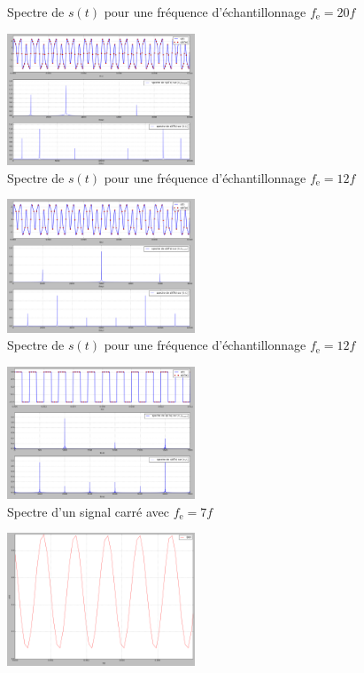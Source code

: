 \documentclass[a4paper]{article}
\begin{document}
\begin{multicols}{2}
\begin{figure}[H]
			\caption{Spectre de $s(t)$\/ pour une fréquence d'échantillonnage $f_\text{e} = 20f$}
		\end{figure}
		\begin{figure}[H]
			\centering
			\includegraphics[width=0.5\textwidth]{figures/Capture7.png}
			\caption{Spectre de $s(t)$\/ pour une fréquence d'échantillonnage $f_\text{e} = 12f$}
		\end{figure}
		\begin{figure}[H]
			\centering
			\includegraphics[width=0.5\textwidth]{figures/Capture8.png}
			\caption{Spectre de $s(t)$\/ pour une fréquence d'échantillonnage $f_\text{e} = 12f$}
		\end{figure}
		\begin{figure}[H]
			\centering
			\includegraphics[width=0.5\textwidth]{figures/Capture9.png}
			\caption{Spectre d'un signal carré avec $f_\text{e} = 7f$}
		\end{figure}
		\begin{figure}[H]
			\centering
			\includegraphics[width=0.5\textwidth]{figures/Capture10.png}

\end{figure}
\end{multicols}
\end{document}
